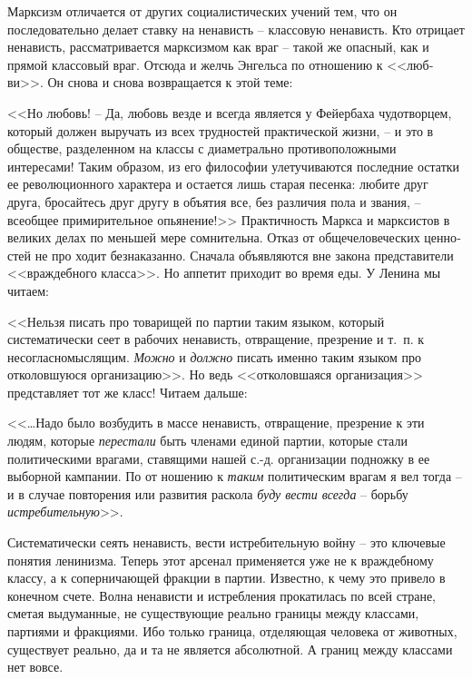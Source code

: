 \documentclass{book}
\begin{document}
Марксизм отличается от других социалистических учений тем, что он последовательно делает ставку на ненависть -- клас­совую 
ненависть. Кто отрицает ненависть, рассматривается марксизмом как враг -- такой же опасный, как и прямой классовый враг. Отсюда 
и желчь Энгельса по отношению к <<люб­ви>>. Он снова и снова возвращается к этой теме:

<<Но любовь! -- Да, любовь везде и всегда является у Фейер­баха чудотворцем, который должен выручать из всех трудно­стей 
практической жизни, -- и это в обществе, разделенном на классы с диаметрально противоположными интересами! Та­ким образом, из его 
философии улетучиваются последние остат­ки ее революционного характера и остается лишь старая песен­ка: любите друг друга, 
бросайтесь друг другу в объятия все, без различия пола и звания, -- всеобщее примирительное опьянение!>>%
Практичность Маркса и марксистов в великих делах по меньшей мере сомнительна. Отказ от общечеловеческих ценно­стей не про ходит 
безнаказанно. Сначала объявляются вне закона представители <<враждебного класса>>. Но аппетит приходит во время еды. У Ленина мы 
читаем:

<<Нельзя писать про товарищей по партии таким языком, ко­торый систематически сеет в рабочих ненависть, отвращение, презрение и т.~п. к несогласномыслящим. \textit{Можно} и \textit{должно}  пи­сать именно таким языком про отколовшуюся организацию>>.
Но ведь <<отколовшаяся организация>> представляет тот же класс! Читаем дальше:

<<\ldots Надо было возбудить в массе ненависть, отвращение, презрение к эти людям, которые \textit{перестали}  быть членами 
единой партии, которые стали политическими врагами, ставящими на­шей с.-д. организации подножку в ее выборной кампании. По от­
ношению к \textit{таким}  политическим врагам я вел тогда -- и в случае повторения или развития раскола \textit{буду вести 
всегда} --  борьбу \textit{истребительную}>>.%

Систематически сеять ненависть, вести истребительную вой­ну -- это ключевые понятия ленинизма. Теперь этот арсенал при­меняется 
уже не к враждебному классу, а к соперничающей фракции в партии. Известно, к чему это привело в конечном счете. Волна ненависти 
и истребления прокатилась по всей стра­не, сметая выдуманные, не существующие реально границы между классами, партиями и 
фракциями. Ибо только граница, отделяющая человека от животных, существует реально, да и та не является абсолютной. А границ 
между классами нет вовсе.
\end{document}
